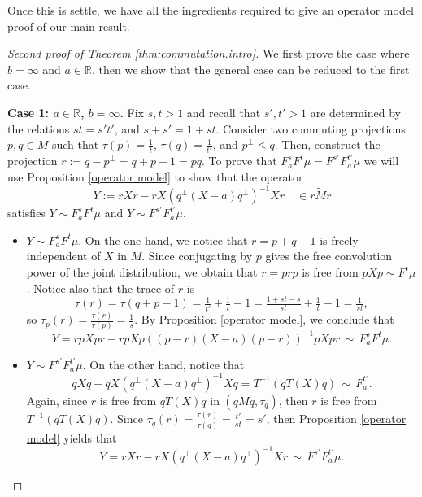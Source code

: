 \documentclass[reqno,11pt]{amsart}
\theoremstyle{remark}
\newcommand{\rr}{\mathbb{R}}
\newcommand{\freepower}[1]{F^{#1}}
\newcommand{\pfreepower}[2]{F_{#1}^{#2}}
\begin{document}
Once this is settle, we have all the ingredients required to give an operator model proof of our main result. 

\begin{proof}[Second proof of Theorem \ref{thm:commutation.intro}]

We first prove the case where $b=\infty$ and $a\in \rr$, then we show that the general case can be reduced to the first case.

\textbf{Case 1: $a\in \rr$, $b=\infty$.} Fix $s,t> 1$ and recall that $s',t' >1$ are determined by the relations $ st=s't' $, and $ s+s' = 1+st $. Consider two commuting projections $ p,q\in M $ such that $ \tau(p)=\tfrac{1}{t} $, $\tau(q)=\tfrac{1}{t'} $, and $ p^\perp \leq q $. Then, construct the projection $r := q-p^{\perp} = q+p-1=pq$. To prove that $ \pfreepower{a}{s}\freepower{t}\mu = \freepower{s'}\pfreepower{a}{t'}\mu $ we will use Proposition \ref{operator model} to show that the operator 
$$Y:=rXr-rX( q^{\perp} (X-a) q^{\perp} )^{-1}Xr \quad \in \widetilde{rMr}$$
satisfies $Y \sim \pfreepower{a}{s}\freepower{t}\mu$ and $Y\sim \freepower{s'}\pfreepower{a}{t'}\mu$.
\begin{itemize}
    \item $Y \sim \pfreepower{a}{s}\freepower{t}\mu$. On the one hand, we notice that $r= p+q-1$ is freely independent of $X$ in $M$. Since conjugating by $p$ gives the free convolution power of the joint distribution, we obtain that $r = prp$ is free from $ pXp \sim \freepower{t}\mu$. Notice also that the trace of $r$ is
$$ \tau(r)= \tau(q+p-1) = \tfrac{1}{t'}+\tfrac{1}{t}-1 = \tfrac{1+st-s}{st}+\tfrac{1}{t}-1= \tfrac{1}{st},$$
so $\tau_p(r)=\frac{\tau(r)}{\tau(p)}=\frac{1}{s}$. By Proposition \ref{operator model}, we conclude that
$$Y= rpXpr-rpXp( (p-r) (X-a) (p-r) )^{-1}pXpr \, \sim \, \pfreepower{a}{s}\freepower{t}\mu. $$

\item $Y\sim \freepower{s'}\pfreepower{a}{t'}\mu$. On the other hand, notice that 
$$ qXq-qX( q^{\perp} (X-a) q^{\perp} )^{-1}Xq = T^{-1}(qT(X)q) \, \sim \, \pfreepower{a}{t'}.$$ 
Again, since $r$ is free from  $qT(X)q $ in $ (qMq,\tau_q) $, then $r$ is free from $ T^{-1}(qT(X)q) $.  Since $\tau_q(r)=\frac{\tau(r)}{\tau(q)}=\tfrac{t'}{st} =s' $, then Proposition \ref{operator model} yields that
$$Y= rXr-rX( q^{\perp} (X-a) q^{\perp} )^{-1}Xr \, \sim \,\freepower{s'}\pfreepower{a}{t'}\mu .$$ 
\end{itemize}


\end{proof}
\end{document}
